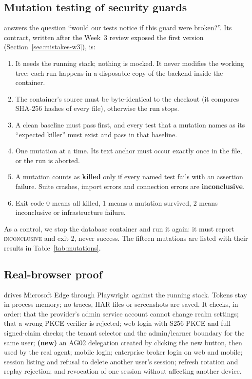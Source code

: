 \subsection{Mutation testing of security guards}
\label{sec:mutation}
 answers the question ``would our tests notice if this guard were broken?''. Its contract, written after the Week~3 review exposed the first version (Section~\ref{sec:mistakes-w3}), is:
\begin{enumerate}
  \item It needs the running stack; nothing is mocked. It never modifies the working tree; each run happens in a disposable copy of the backend inside the container.
  \item The container's source must be byte-identical to the checkout (it compares SHA-256 hashes of every file), otherwise the run stops.
  \item A clean baseline must pass first, and every test that a mutation names as its ``expected killer'' must exist and pass in that baseline.
  \item One mutation at a time. Its text anchor must occur exactly once in the file, or the run is aborted.
  \item A mutation counts as \textbf{killed} only if every named test fails with an assertion failure. Suite crashes, import errors and connection errors are \textbf{inconclusive}.
  \item Exit code 0 means all killed, 1 means a mutation survived, 2 means inconclusive or infrastructure failure.
\end{enumerate}
As a control, we stop the database container and run it again: it must report \textsc{inconclusive} and exit 2, never success. The fifteen mutations are listed with their results in Table~\ref{tab:mutations}.

\subsection{Real-browser proof}
\label{sec:browser}
 drives Microsoft Edge through Playwright against the running stack. Tokens stay in process memory; no traces, HAR files or screenshots are saved. It checks, in order: that the provider's admin service account cannot change realm settings; that a wrong PKCE verifier is rejected; web login with S256 PKCE and full signed-claim checks; the tenant selector and the admin/learner boundary for the same user; \textbf{(new)} an AG02 delegation created by clicking the new button, then used by the real agent; mobile login; enterprise broker login on web and mobile; session listing and refusal to delete another user's session; refresh rotation and replay rejection; and revocation of one session without affecting another device.

